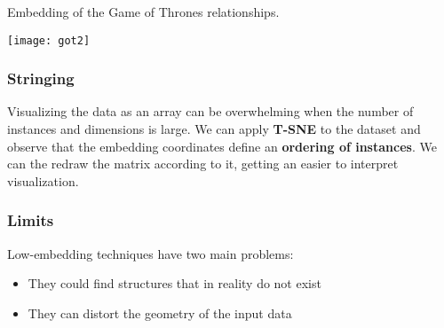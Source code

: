\begin{example}
	Embedding of the Game of Thrones relationships.
	\begin{center}
		\texttt{[image: got2]}
	\end{center}
\end{example}

\subsubsection{Stringing}
Visualizing the data as an array can be overwhelming when the number of instances and dimensions is large. We can apply \textbf{T-SNE} to the dataset and observe that the embedding coordinates define an \textbf{ordering of instances}. We can the redraw the matrix according to it, getting an easier to interpret visualization.

\begin{figure}[!h]
	\hfill
	\hfill
	\hfill
\end{figure}

\subsubsection{Limits}
Low-embedding techniques have two main problems:
\begin{itemize}
	\item They could find structures that in reality do not exist
	\item They can distort the geometry of the input data 
\end{itemize}